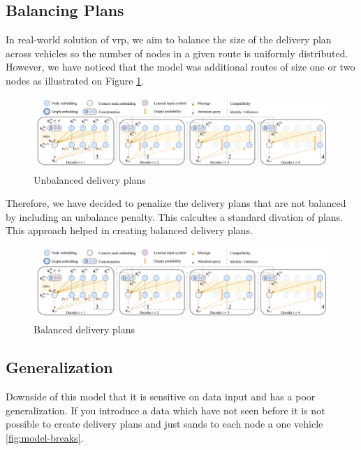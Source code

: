 \subsection{Balancing Plans}
In real-world solution of \gls{vrp}, we aim to balance the size of the delivery plan across vehicles so the number of nodes in a given route is uniformly distributed. However, we have noticed that the model was additional routes of size one or two nodes as illustrated on Figure \ref{fig:unbalanced}.

\begin{figure}[ht]
    \centering
    \includegraphics[width=1.0\textwidth]{resources/vrptw-ai/decoder-diagram.png}
    \caption{Unbalanced delivery plans \cite{attention-route}}
    \label{fig:unbalanced}
\end{figure}

Therefore, we have decided to penalize the delivery plans that are not balanced by including an unbalance penalty. This calcultes a standard divation of plans. This approach helped in creating balanced delivery plans.

\begin{figure}[ht]
    \centering
    \includegraphics[width=1.0\textwidth]{resources/vrptw-ai/decoder-diagram.png}
    \caption{Balanced delivery plans \cite{attention-route}}
    \label{fig:balanced}
\end{figure}

\subsection{Generalization}

Downside of this model that it is sensitive on data input and has a poor generalization. If you introduce a data which have not seen before it is not possible to create delivery plans and just sands to each node a one vehicle \ref{fig:model-breaks}.

